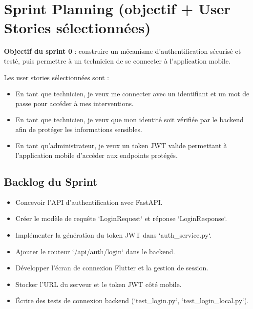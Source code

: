 \documentclass[12pt,a4paper]{report}
\begin{document}
\section{Sprint Planning (objectif + User Stories sélectionnées)}
\noindent \textbf{Objectif du sprint 0} : construire un mécanisme d'authentification sécurisé et testé, puis permettre à un technicien de se connecter à l'application mobile.

\noindent Les user stories sélectionnées sont :
\begin{itemize}
    \item En tant que technicien, je veux me connecter avec un identifiant et un mot de passe pour accéder à mes interventions.
    \item En tant que technicien, je veux que mon identité soit vérifiée par le backend afin de protéger les informations sensibles.
    \item En tant qu'administrateur, je veux un token JWT valide permettant à l'application mobile d'accéder aux endpoints protégés.
\end{itemize}

\subsection{Backlog du Sprint}
\begin{itemize}
    \item Concevoir l'API d'authentification avec FastAPI.
    \item Créer le modèle de requête `LoginRequest` et réponse `LoginResponse`.
    \item Implémenter la génération du token JWT dans `auth_service.py`.
    \item Ajouter le routeur `/api/auth/login` dans le backend.
    \item Développer l'écran de connexion Flutter et la gestion de session.
    \item Stocker l'URL du serveur et le token JWT côté mobile.
    \item Écrire des tests de connexion backend (`test_login.py`, `test_login_local.py`).
\end{itemize}
\end{document}
